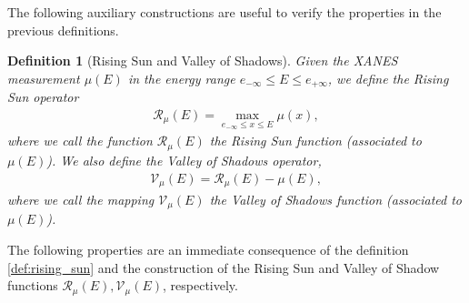 \documentclass[%
 reprint,
 amsmath,amssymb,
 aps,
]{revtex4-1}
\newtheorem{Definition}[Lemma]{Definition}
\begin{document}
\noindent
The following auxiliary constructions are useful to verify the properties in the previous definitions.
\begin{Definition}[Rising Sun and Valley of Shadows]
Given the XANES measurement $\mu(E)$ in the energy range $e_{-\infty}\leq E\leq e_{+\infty}$,   we define the Rising Sun operator
%
\begin{align}\label{rising_sun}
  \mathcal{R}_{\mu}(E) = \max_{e_{-\infty}\leq x \leq E} \mu(x),%
\end{align}
%
where we call the function $\mathcal{R}_{\mu}(E)$ the Rising Sun function (associated to $\mu(E)$). We also define the Valley of Shadows operator,
%
\begin{align}\label{valley_of_shadows}
  \mathcal{V}_{\mu}(E) = \mathcal{R}_{\mu}(E) -  \mu(E),%
\end{align}
%
where we call the mapping $\mathcal{V}_{\mu}(E)$ the Valley of Shadows function (associated to $\mu(E)$).
\end{Definition}
The following properties are an immediate consequence of the definition \ref{def:rising_sun} and the construction of the Rising Sun and Valley of Shadow functions $\mathcal{R}_{\mu}(E), \mathcal{V}_{\mu}(E)$, respectively.
\end{document}
